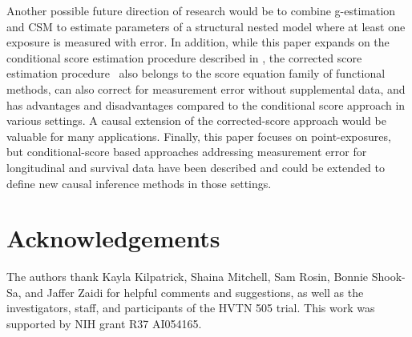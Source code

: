 \documentclass[useAMS,usenatbib,referee]{biom}
\begin{document}
Another possible future direction of research would be to combine g-estimation and CSM to estimate parameters of a structural nested model where at least one exposure is measured with error. In addition, while this paper expands on the conditional score estimation procedure described in \citet{stefanski1987}, the corrected score estimation procedure~\citep{nakamura1990} also belongs to the score equation family of functional methods, can also correct for measurement error without supplemental data, and has advantages and disadvantages compared to the conditional score approach in various settings. A causal extension of the corrected-score approach would be valuable for many applications. Finally, this paper focuses on point-exposures, but conditional-score based approaches addressing measurement error for longitudinal and survival data have been described and could be extended to define new causal inference methods in those settings.





\backmatter


\section*{Acknowledgements}

The authors thank Kayla Kilpatrick, Shaina Mitchell, Sam Rosin, Bonnie Shook-Sa, and Jaffer Zaidi for helpful comments and suggestions, as well as the investigators, staff, and participants of the HVTN 505 trial. This work was supported by NIH grant R37 AI054165. \vspace*{-8pt}

\end{document}
